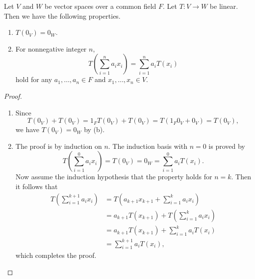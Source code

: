 \begin{proposition}
  \label{prop:linear-transformation}
  Let $V$ and $W$ be vector spaces over a common field $F$.
  Let ${T: V \to W}$ be linear.
  Then we have the following properties.
  \begin{enumerate}
    \item $T(0_V) = 0_W$.
    \item For nonnegative integer $n$,
    \begin{equation*}
      T\left(\sum_{i=1}^n a_ix_i\right) = \sum_{i=1}^n a_iT(x_i)
    \end{equation*}
    hold for any $a_1, \dots, a_n \in F$ and $x_1, \dots, x_n \in V$.
  \end{enumerate}
\end{proposition}
\begin{proof}
  \leavevmode
  \begin{enumerate}
    \item Since
    \begin{equation*}
      T(0_V) + T(0_V)
      = 1_FT(0_V) + T(0_V)
      = T(1_F0_V + 0_V)
      = T(0_V),
    \end{equation*}
    we have $T(0_V) = 0_W$ by  (b).
    
    \item The proof is by induction on $n$.
    The induction basis with $n = 0$ is proved by
    \begin{equation*}
      T\left(\sum_{i=1}^0 a_ix_i\right)
      = T(0_V)
      = 0_W
      = \sum_{i=1}^0 a_iT(x_i).
    \end{equation*}
    Now assume the induction hypothesis that the property holds for $n = k$.
    Then it follows that
    \begin{align*}
      T\left(\sum_{i=1}^{k+1}a_ix_i\right)
      &= T\left(a_{k+1}x_{k+1} + \sum_{i=1}^k a_ix_i\right) \\
      &= a_{k+1}T(x_{k+1}) + T\left(\sum_{i=1}^k a_ix_i\right)
         \tag{linearity of $T$} \\
      &= a_{k+1}T(x_{k+1}) + \sum_{i=1}^k a_iT(x_i)
         \tag{induction hypothesis} \\
      &= \sum_{i=1}^{k+1} a_iT(x_i),
    \end{align*}
    which completes the proof.
    \qedhere
  \end{enumerate}
\end{proof}

